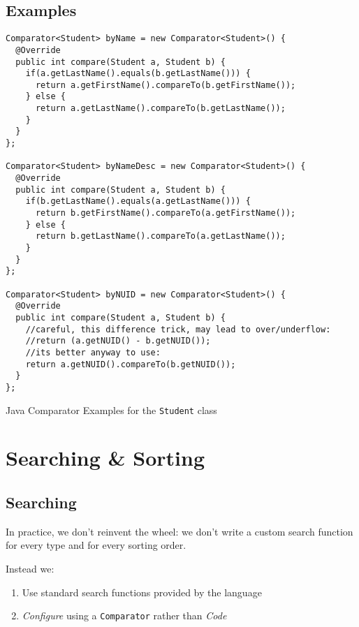\subsection{Examples}

\begin{listing}[H]
\begin{verbatim}
Comparator<Student> byName = new Comparator<Student>() {
  @Override
  public int compare(Student a, Student b) {
    if(a.getLastName().equals(b.getLastName())) {
      return a.getFirstName().compareTo(b.getFirstName());
    } else {
      return a.getLastName().compareTo(b.getLastName());
    }
  }
};
		
Comparator<Student> byNameDesc = new Comparator<Student>() {
  @Override
  public int compare(Student a, Student b) {
    if(b.getLastName().equals(a.getLastName())) {
      return b.getFirstName().compareTo(a.getFirstName());
    } else {
      return b.getLastName().compareTo(a.getLastName());
    }
  }
};
		
Comparator<Student> byNUID = new Comparator<Student>() {
  @Override
  public int compare(Student a, Student b) {
  	//careful, this difference trick, may lead to over/underflow:
	//return (a.getNUID() - b.getNUID());
	//its better anyway to use:
	return a.getNUID().compareTo(b.getNUID());
  }
};
\end{verbatim}
\caption{Java Comparator Examples for the \texttt{Student} class}
\end{listing}


\section{Searching \& Sorting}


\subsection{Searching}

In practice, we don't reinvent the wheel: we don't write a custom search function for every type and for every sorting order.

Instead we:
\begin{enumerate}
  \item Use standard search functions provided by the language
  \item \emph{Configure} using a \texttt{Comparator} rather 
    than \emph{Code}
\end{enumerate}

